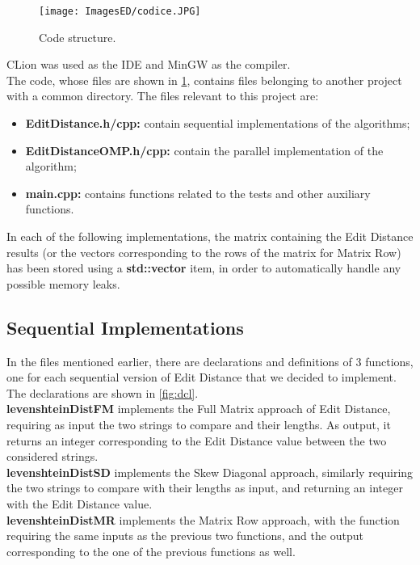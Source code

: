 \documentclass[10pt,twocolumn,letterpaper]{article}
\newcommand{\bit} {\begin{itemize} }
\newcommand{\eit} {\end{itemize} }
\begin{document}
\begin{figure}[h]
    \centering
    \texttt{[image: ImagesED/codice.JPG]}
    \caption{Code structure.}
    \label{fig:ci}
\end{figure}

CLion was used as the IDE and MinGW as the compiler.\\
The code, whose files are shown in \cref{fig:ci}, contains files belonging to another project with a common directory. The files relevant to this project are:

\bit
    \item{\textbf{EditDistance.h/cpp:} contain sequential implementations of the algorithms;}
    \item{\textbf{EditDistanceOMP.h/cpp:} contain the parallel implementation of the algorithm;}
    \item{\textbf{main.cpp:} contains functions related to the tests and other auxiliary functions.}
\eit

In each of the following implementations, the matrix containing the Edit Distance results (or the vectors corresponding to the rows of the matrix for Matrix Row) has been stored using a \textbf{std::vector} item, in order to automatically handle any possible memory leaks.

\subsection{Sequential Implementations}

In the files mentioned earlier, there are declarations and definitions of 3 functions, one for each sequential version of Edit Distance that we decided to implement.\\
The declarations are shown in \cref{fig:dcl}.\\
\textbf{levenshteinDistFM} implements the Full Matrix approach of Edit Distance, requiring as input the two strings to compare and their lengths. As output, it returns an integer corresponding to the Edit Distance value between the two considered strings.\\
\textbf{levenshteinDistSD} implements the Skew Diagonal approach, similarly requiring the two strings to compare with their lengths as input, and returning an integer with the Edit Distance value.\\
\textbf{levenshteinDistMR} implements the Matrix Row approach, with the function requiring the same inputs as the previous two functions, and the output corresponding to the one of the previous functions as well.
\end{document}
